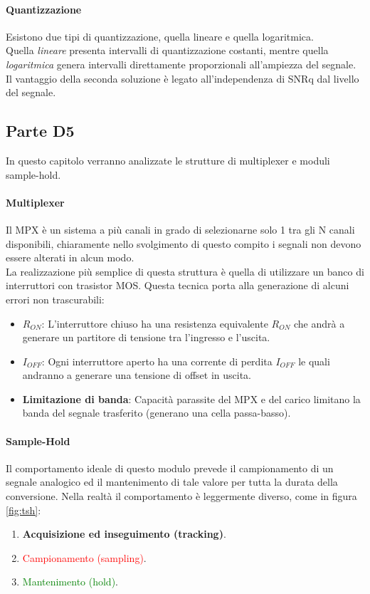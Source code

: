 \documentclass[12pt]{article}
\begin{document}
\paragraph{Quantizzazione} Esistono due tipi di quantizzazione, quella lineare e quella logaritmica.\\
Quella \textit{lineare} presenta intervalli di quantizzazione costanti, mentre quella \textit{logaritmica} genera intervalli direttamente proporzionali all'ampiezza del segnale.
Il vantaggio della seconda soluzione è legato all'independenza di SNRq dal livello del segnale.

\subsection{Parte D5}\label{d5}
In questo capitolo verranno analizzate le strutture di multiplexer e moduli sample-hold.

\paragraph{Multiplexer} Il MPX è un sistema a più canali in grado di selezionarne solo 1 tra gli N canali disponibili, chiaramente nello svolgimento di questo compito i segnali non devono essere alterati in alcun modo.\\
La realizzazione più semplice di questa struttura è quella di utilizzare un banco di interruttori con trasistor MOS. Questa tecnica porta alla generazione di alcuni errori non trascurabili:
\begin{itemize}
  \item \textbf{$R_{ON}$}: L'interruttore chiuso ha una resistenza equivalente $R_{ON}$  che andrà a generare un partitore di tensione tra l'ingresso e l'uscita.
  \item \textbf{$I_{OFF}$}: Ogni interruttore aperto ha una corrente di perdita $I_{OFF}$ le quali andranno a generare una tensione di offset in uscita.
  \item \textbf{Limitazione di banda}: Capacità parassite del MPX e del carico limitano la banda del segnale trasferito (generano una cella passa-basso).
\end{itemize}

\paragraph{Sample-Hold} Il comportamento ideale di questo modulo prevede il campionamento di un segnale analogico ed il mantenimento di tale valore per tutta la durata della conversione. Nella realtà il comportamento è leggermente diverso, come in figura \ref{fig:tsh}:
\begin{enumerate}
  \item \textcolor{RedOrange}{\textbf{Acquisizione ed inseguimento (tracking)}}.
  \item \textcolor{Red}{Campionamento (sampling)}.
  \item \textcolor{Green}{Mantenimento (hold)}.
\end{enumerate}
\end{document}
